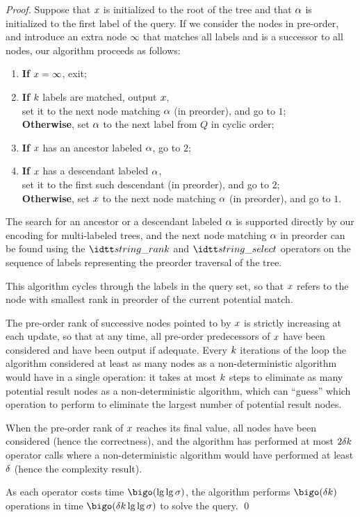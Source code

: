 \begin{proof}
  Suppose that $x$ is initialized to the root of the tree and
  that $\alpha$ is initialized to the first label of the query.
  If we consider the nodes in pre-order, and introduce an extra node
  $\infty$ that matches all labels and is a successor to all nodes,
  our algorithm proceeds as follows:
  \begin{enumerate}
  \item \textbf{ If} $x=\infty$, exit;
  \item \textbf{ If} $k$ labels are matched, output $x$, \\
    set it to the next node matching $\alpha$ (in preorder), and go to $1$; \\
    \textbf{ Otherwise}, set $\alpha$ to the next label from $Q$ in cyclic order;
  \item \textbf{ If} $x$ has an ancestor labeled $\alpha$, go to $2$;    
  \item \textbf{ If} $x$ has a descendant labeled $\alpha$, \\
    set it to the first such descendant (in preorder), and go to $2$;         \\
    \textbf{ Otherwise}, set $x$ to the next node matching
    $\alpha$ (in preorder), and go to $1$.
  \end{enumerate}
  
  The search for an ancestor or a descendant labeled $\alpha$ is
  supported directly by our encoding for multi-labeled trees, and the
  next node matching $\alpha$ in preorder can be found using the
  $\StrRank$ and $\StrSelect$ operators on the sequence of labels
  representing the preorder traversal of the tree.

  This algorithm cycles through the labels in the query set, so that
  $x$ refers to the node with smallest rank in preorder of the
  current potential match.

  The pre-order rank of successive nodes pointed to by $x$ is
  strictly increasing at each update, so that at any time, all
  pre-order predecessors of $x$ have been considered and have
  been output if adequate.
  Every $k$ iterations of the loop the algorithm considered
  at least as many nodes as a non-deterministic algorithm would have
  in a single operation: it takes at most $k$ steps to
  eliminate as many potential result nodes as a non-deterministic
  algorithm, which can ``guess'' which operation to perform to
  eliminate the largest number of potential result nodes.

  When the pre-order rank of $x$ reaches its final value, all
  nodes have been considered (hence the correctness), and the
  algorithm has performed at most $2\delta k$ operator
  calls where a non-deterministic algorithm would have performed at
  least $\delta$ (hence the complexity result).

  As each operator costs time $\mSequenceTime$, the algorithm performs
  $\mTreeExactSearches$ operations in time $\mTreeExactTime$ to solve
  the query.  \qed
\end{proof}


